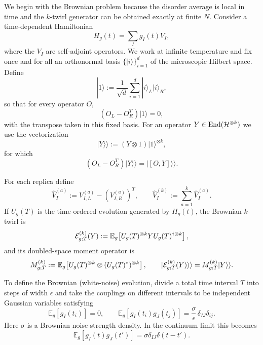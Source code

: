 \documentclass{article}
\theoremstyle{definition}
\begin{document}
We begin with the Brownian problem because the disorder average is local in
time and the $k$-twirl generator can be obtained exactly at finite $N$.
Consider a time-dependent Hamiltonian
\begin{equation}
    H_g(t)=\sum_I g_I(t)V_I,
\end{equation}
where the $V_I$ are self-adjoint operators.  We work at infinite temperature
and fix once and for all an orthonormal basis $\{|i\rangle\}_{i=1}^d$ of the
microscopic Hilbert space.  Define
\begin{equation}
    |1\rangle
    :=\frac{1}{\sqrt d}\sum_{i=1}^d|i\rangle_L|i\rangle_R,
\end{equation}
so that for every operator $O$,
\begin{equation}
    (O_L-O_R^T)|1\rangle=0,
\end{equation}
with the transpose taken in this fixed basis.  For an operator
$Y\in{\rm End}({\cal H}^{\otimes k})$ we use the vectorization
\begin{equation}
    |Y\rangle\rangle:=(Y\otimes1)|1\rangle^{\otimes k},
\end{equation}
for which
\begin{equation}
    (O_L-O_R^T)|Y\rangle\rangle
    =|[O,Y]\rangle\rangle.
\end{equation}

For each replica define
\begin{equation}
    \widehat V_I^{(a)}
    :=V_{I,L}^{(a)}-(V_{I,R}^{(a)})^T,
    \qquad
    \widehat V_I^{(k)}
    :=\sum_{a=1}^k\widehat V_I^{(a)}.
\end{equation}
If $U_g(T)$ is the time-ordered evolution generated by $H_g(t)$, the
Brownian $k$-twirl is
\begin{equation}
    {\cal E}_{g;T}^{(k)}(Y)
    :=\mathbb E_g\!\left[
       U_g(T)^{\otimes k}Y U_g(T)^{\dagger\otimes k}
    \right],
\end{equation}
and its doubled-space moment operator is
\begin{equation}
    M_{g;T}^{(k)}
    :=\mathbb E_g\!\left[
       U_g(T)^{\otimes k}\otimes(U_g(T)^*)^{\otimes k}
    \right],
    \qquad
    |{\cal E}_{g;T}^{(k)}(Y)\rangle\rangle
    =M_{g;T}^{(k)}|Y\rangle\rangle.
\end{equation}

To define the Brownian (white-noise) evolution, divide a total time interval $T$ into
steps of width $\epsilon$ and take the couplings on different intervals to
be independent Gaussian variables satisfying
\begin{equation}
    \mathbb E_g[g_I(t_i)]=0,
    \qquad
    \mathbb E_g[g_I(t_i)g_J(t_j)]
    =\frac{\sigma}{\epsilon}\,
     \delta_{IJ}\delta_{ij}.
\end{equation}
Here $\sigma$ is a Brownian noise-strength density.  In the continuum limit
this becomes
\begin{equation}
    \mathbb E_g[g_I(t)g_J(t')]
    =\sigma\delta_{IJ}\delta(t-t').
\end{equation}
\end{document}
